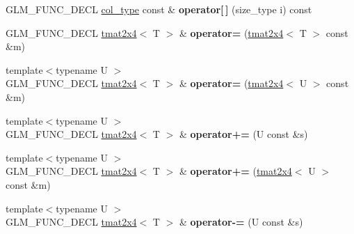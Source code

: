 \begin{DoxyCompactItemize}
\item 
\hypertarget{structglm_1_1detail_1_1tmat2x4_ad5c0e482eaa56f65ba4faa69d142d15e}{}G\+L\+M\+\_\+\+F\+U\+N\+C\+\_\+\+D\+E\+C\+L \hyperlink{structglm_1_1detail_1_1tvec4}{col\+\_\+type} const \& {\bfseries operator\mbox{[}$\,$\mbox{]}} (size\+\_\+type i) const \label{structglm_1_1detail_1_1tmat2x4_ad5c0e482eaa56f65ba4faa69d142d15e}

\item 
\hypertarget{structglm_1_1detail_1_1tmat2x4_a23f1bed296125c57dca1f5fe1f4b87a1}{}G\+L\+M\+\_\+\+F\+U\+N\+C\+\_\+\+D\+E\+C\+L \hyperlink{structglm_1_1detail_1_1tmat2x4}{tmat2x4}$<$ T $>$ \& {\bfseries operator=} (\hyperlink{structglm_1_1detail_1_1tmat2x4}{tmat2x4}$<$ T $>$ const \&m)\label{structglm_1_1detail_1_1tmat2x4_a23f1bed296125c57dca1f5fe1f4b87a1}

\item 
\hypertarget{structglm_1_1detail_1_1tmat2x4_aec127be8dd6961954be4e288c6284850}{}{\footnotesize template$<$typename U $>$ }\\G\+L\+M\+\_\+\+F\+U\+N\+C\+\_\+\+D\+E\+C\+L \hyperlink{structglm_1_1detail_1_1tmat2x4}{tmat2x4}$<$ T $>$ \& {\bfseries operator=} (\hyperlink{structglm_1_1detail_1_1tmat2x4}{tmat2x4}$<$ U $>$ const \&m)\label{structglm_1_1detail_1_1tmat2x4_aec127be8dd6961954be4e288c6284850}

\item 
\hypertarget{structglm_1_1detail_1_1tmat2x4_a0e73b6f6a88eae5236bd38cd153cdec3}{}{\footnotesize template$<$typename U $>$ }\\G\+L\+M\+\_\+\+F\+U\+N\+C\+\_\+\+D\+E\+C\+L \hyperlink{structglm_1_1detail_1_1tmat2x4}{tmat2x4}$<$ T $>$ \& {\bfseries operator+=} (U const \&s)\label{structglm_1_1detail_1_1tmat2x4_a0e73b6f6a88eae5236bd38cd153cdec3}

\item 
\hypertarget{structglm_1_1detail_1_1tmat2x4_abb0f4bd0dfd03f0bc7f30961a9f17c21}{}{\footnotesize template$<$typename U $>$ }\\G\+L\+M\+\_\+\+F\+U\+N\+C\+\_\+\+D\+E\+C\+L \hyperlink{structglm_1_1detail_1_1tmat2x4}{tmat2x4}$<$ T $>$ \& {\bfseries operator+=} (\hyperlink{structglm_1_1detail_1_1tmat2x4}{tmat2x4}$<$ U $>$ const \&m)\label{structglm_1_1detail_1_1tmat2x4_abb0f4bd0dfd03f0bc7f30961a9f17c21}

\item 
\hypertarget{structglm_1_1detail_1_1tmat2x4_abd54d0c6d5f17a59255bfed83f764bea}{}{\footnotesize template$<$typename U $>$ }\\G\+L\+M\+\_\+\+F\+U\+N\+C\+\_\+\+D\+E\+C\+L \hyperlink{structglm_1_1detail_1_1tmat2x4}{tmat2x4}$<$ T $>$ \& {\bfseries operator-\/=} (U const \&s)\label{structglm_1_1detail_1_1tmat2x4_abd54d0c6d5f17a59255bfed83f764bea}


\end{DoxyCompactItemize}
